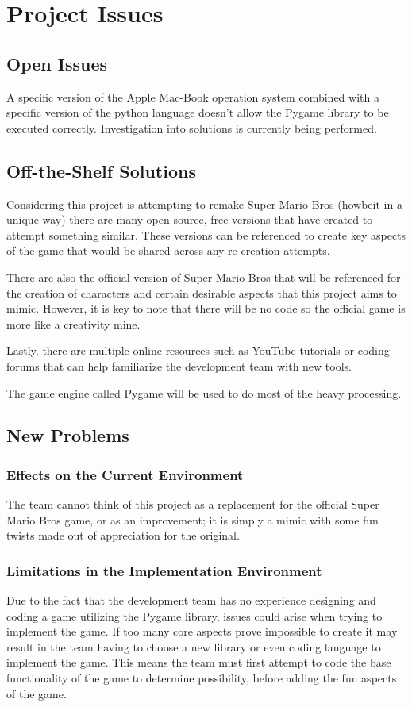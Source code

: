 \documentclass[12pt, titlepage]{article}
\begin{document}
\section{Project Issues}

\subsection{Open Issues}
A specific version of the Apple Mac-Book operation system combined with a specific version of the python language doesn't allow the Pygame library to be executed correctly. Investigation into solutions is currently being performed.

\subsection{Off-the-Shelf Solutions}
Considering this project is attempting to remake Super Mario Bros (howbeit in a unique way) there are many open source, free versions that have created to attempt something similar. These versions can be referenced to create key aspects of the game that would be shared across any re-creation attempts.

There are also the official version of Super Mario Bros that will be referenced for the creation of characters and certain desirable aspects that this project aims to mimic. However, it is key to note that there will be no code so the official game is more like a creativity mine.

Lastly, there are multiple online resources such as YouTube tutorials or coding forums that can help familiarize the development team with new tools. 

The game engine called Pygame will be used to do most of the heavy processing.

\subsection{New Problems}
\subsubsection{Effects on the Current Environment}
The team cannot think of this project as a replacement for the official Super Mario Bros game, or as an improvement; it is simply a mimic with some fun twists made out of appreciation for the original.

\subsubsection{Limitations in the Implementation Environment}
Due to the fact that the development team has no experience designing and coding a game utilizing the Pygame library, issues could arise when trying to implement the game. If too many core aspects prove impossible to create it may result in the team having to choose a new library or even coding language to implement the game. This means the team must first attempt to code the base functionality of the game to determine possibility, before adding the fun aspects of the game.
\end{document}
